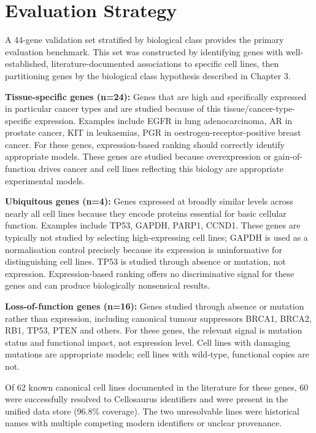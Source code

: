 \documentclass[author={Karen Coutinho, Ishaan Bhalla, Aman Raj, Dixit Kaloorani Malarmannan},
                supervisor={Dr. Daniel D'Andrea},
                degree={MSc},
                title={CellSelector Omics: A Multi-Omics Recommendation System for Cell Line Selection},
                subtitle={},
                type={},
                year={2026}]{dissertation}
\begin{document}
\section{Evaluation Strategy}

A 44-gene validation set stratified by biological class provides the primary evaluation benchmark. This set was constructed by identifying genes with well-established, literature-documented associations to specific cell lines, then partitioning genes by the biological class hypothesis described in Chapter 3.

{\bf Tissue-specific genes (n=24):} Genes that are high and specifically expressed in particular cancer types and are studied because of this tissue/cancer-type-specific expression. Examples include EGFR in lung adenocarcinoma, AR in prostate cancer, KIT in leukaemias, PGR in oestrogen-receptor-positive breast cancer. For these genes, expression-based ranking should correctly identify appropriate models. These genes are studied because overexpression or gain-of-function drives cancer and cell lines reflecting this biology are appropriate experimental models.

{\bf Ubiquitous genes (n=4):} Genes expressed at broadly similar levels across nearly all cell lines because they encode proteins essential for basic cellular function. Examples include TP53, GAPDH, PARP1, CCND1. These genes are typically not studied by selecting high-expressing cell lines; GAPDH is used as a normalisation control precisely because its expression is uninformative for distinguishing cell lines. TP53 is studied through absence or mutation, not expression. Expression-based ranking offers no discriminative signal for these genes and can produce biologically nonsensical results.

{\bf Loss-of-function genes (n=16):} Genes studied through absence or mutation rather than expression, including canonical tumour suppressors BRCA1, BRCA2, RB1, TP53, PTEN and others. For these genes, the relevant signal is mutation status and functional impact, not expression level. Cell lines with damaging mutations are appropriate models; cell lines with wild-type, functional copies are not.

Of 62 known canonical cell lines documented in the literature for these genes, 60 were successfully resolved to Cellosaurus identifiers and were present in the unified data store (96.8\% coverage). The two unresolvable lines were historical names with multiple competing modern identifiers or unclear provenance.
\end{document}
